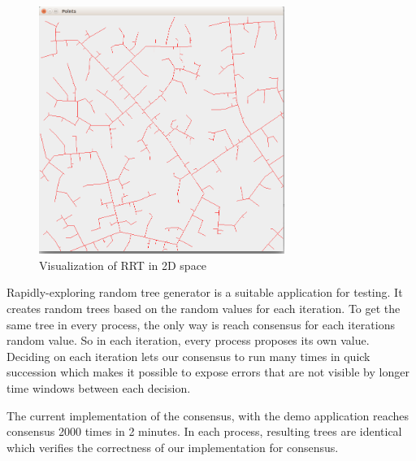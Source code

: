 \documentclass[times, 12pt,twocolumn]{article}
\begin{document}
\begin{figure}[ht!]
\centering
\includegraphics[width=80mm]{rrt.png}
\caption{Visualization of RRT in 2D space}
\label{fig:rrt}
\end{figure}

Rapidly-exploring random tree generator is a suitable application for testing. It creates random trees based on the random values for each iteration. To get the same tree in every process, the only way is reach consensus for each iterations random value. So in each iteration, every process proposes its own value. Deciding on each iteration lets our consensus to run many times in quick succession which makes it possible to expose errors that are not visible by longer time windows between each decision.
 


The current implementation of the consensus, with the demo application reaches consensus 2000 times in 2 minutes. In each process, resulting trees are identical which verifies the correctness of our implementation for consensus. %





 
\end{document}
